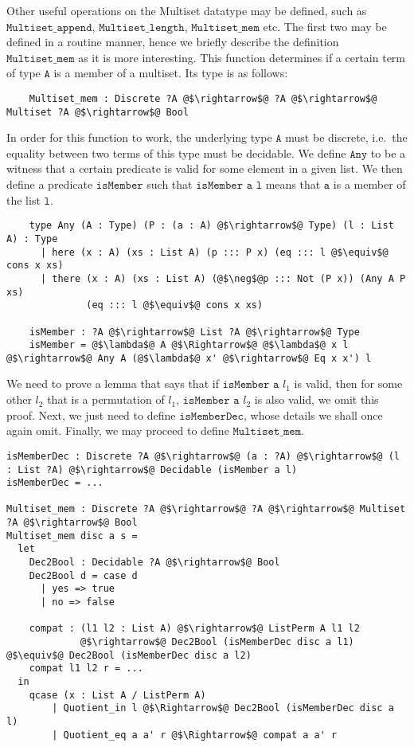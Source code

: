 \documentclass[12pt,twoside,maitrise]{dms}
\theoremstyle{definition}
\numberwithin{equation}{section}
\numberwithin{table}{chapter}
\numberwithin{figure}{chapter}
\newcommand\fn[1] {\texttt{#1}}
\begin{document}
Other useful operations on the Multiset datatype may be defined, such as
$\fn{Multiset\_append}$, $\fn{Multiset\_length}$, $\fn{Multiset\_mem}$ etc. The
first two may be defined in a routine manner, hence we briefly describe the
definition $\fn{Multiset\_mem}$ as it is more interesting. This function
determines if a certain term of type $\fn{A}$ is a member of a multiset. Its
type is as follows:

\begin{verbatim}
    Multiset_mem : Discrete ?A @$\rightarrow$@ ?A @$\rightarrow$@ Multiset ?A @$\rightarrow$@ Bool
\end{verbatim}

In order for this function to work, the underlying type $\fn{A}$ must be
discrete, i.e.\ the equality between two terms of this type must be decidable.
We define $\fn{Any}$ to be a witness that a certain predicate is valid for some
element in a given list. We then define a predicate $\fn{isMember}$ such that
$\fn{isMember a l}$ means that $\fn{a}$ is a member of the list $\fn{l}$.

\begin{verbatim}
    type Any (A : Type) (P : (a : A) @$\rightarrow$@ Type) (l : List A) : Type
      | here (x : A) (xs : List A) (p ::: P x) (eq ::: l @$\equiv$@ cons x xs)
      | there (x : A) (xs : List A) (@$\neg$@p ::: Not (P x)) (Any A P xs)
              (eq ::: l @$\equiv$@ cons x xs)

    isMember : ?A @$\rightarrow$@ List ?A @$\rightarrow$@ Type
    isMember = @$\lambda$@ A @$\Rightarrow$@ @$\lambda$@ x l @$\rightarrow$@ Any A (@$\lambda$@ x' @$\rightarrow$@ Eq x x') l
\end{verbatim}

We need to prove a lemma that says that if $\fn{isMember a $l_1$}$ is valid,
then for some other $\fn{$l_2$}$ that is a permutation of $\fn{$l_1$}$,
$\fn{isMember a $l_2$}$ is also valid, we omit this proof. Next, we just need to
define $\fn{isMemberDec}$, whose details we shall once again omit. Finally, we
may proceed to define $\fn{Multiset\_mem}$.

\begin{verbatim}
isMemberDec : Discrete ?A @$\rightarrow$@ (a : ?A) @$\rightarrow$@ (l : List ?A) @$\rightarrow$@ Decidable (isMember a l)
isMemberDec = ...

Multiset_mem : Discrete ?A @$\rightarrow$@ ?A @$\rightarrow$@ Multiset ?A @$\rightarrow$@ Bool
Multiset_mem disc a s =
  let
    Dec2Bool : Decidable ?A @$\rightarrow$@ Bool
    Dec2Bool d = case d
      | yes => true
      | no => false

    compat : (l1 l2 : List A) @$\rightarrow$@ ListPerm A l1 l2
             @$\rightarrow$@ Dec2Bool (isMemberDec disc a l1) @$\equiv$@ Dec2Bool (isMemberDec disc a l2)
    compat l1 l2 r = ...
  in
    qcase (x : List A / ListPerm A)
        | Quotient_in l @$\Rightarrow$@ Dec2Bool (isMemberDec disc a l)
        | Quotient_eq a a' r @$\Rightarrow$@ compat a a' r
\end{verbatim}
\end{document}
